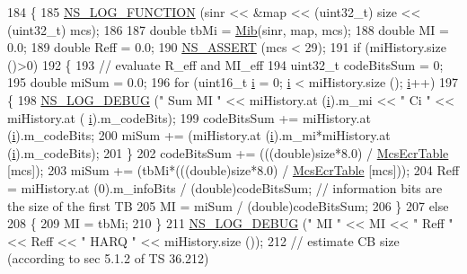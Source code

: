 \begin{DoxyCode}
184 \{
185   \hyperlink{log-macros-disabled_8h_a90b90d5bad1f39cb1b64923ea94c0761}{NS\_LOG\_FUNCTION} (sinr << &map << (uint32\_t) size << (uint32\_t) mcs);
186 
187   \textcolor{keywordtype}{double} tbMi = \hyperlink{classns3_1_1MmWaveMiErrorModel_aace9efaf2ef6d1dfbbfa3fb49c29a977}{Mib}(sinr, map, mcs);
188   \textcolor{keywordtype}{double} MI = 0.0;
189   \textcolor{keywordtype}{double} Reff = 0.0;
190   \hyperlink{assert_8h_a6dccdb0de9b252f60088ce281c49d052}{NS\_ASSERT} (mcs < 29);
191   \textcolor{keywordflow}{if} (miHistory.size ()>0)
192     \{
193       \textcolor{comment}{// evaluate R\_eff and MI\_eff}
194       uint32\_t codeBitsSum = 0;
195       \textcolor{keywordtype}{double} miSum = 0.0;
196       \textcolor{keywordflow}{for} (uint16\_t \hyperlink{bernuolliDistribution_8m_a6f6ccfcf58b31cb6412107d9d5281426}{i} = 0; \hyperlink{bernuolliDistribution_8m_a6f6ccfcf58b31cb6412107d9d5281426}{i} < miHistory.size (); \hyperlink{bernuolliDistribution_8m_a6f6ccfcf58b31cb6412107d9d5281426}{i}++)
197         \{
198           \hyperlink{group__logging_ga413f1886406d49f59a6a0a89b77b4d0a}{NS\_LOG\_DEBUG} (\textcolor{stringliteral}{" Sum MI "} << miHistory.at (\hyperlink{bernuolliDistribution_8m_a6f6ccfcf58b31cb6412107d9d5281426}{i}).m\_mi << \textcolor{stringliteral}{" Ci "} << miHistory.at (
      \hyperlink{bernuolliDistribution_8m_a6f6ccfcf58b31cb6412107d9d5281426}{i}).m\_codeBits);
199           codeBitsSum += miHistory.at (\hyperlink{bernuolliDistribution_8m_a6f6ccfcf58b31cb6412107d9d5281426}{i}).m\_codeBits;
200           miSum += (miHistory.at (\hyperlink{bernuolliDistribution_8m_a6f6ccfcf58b31cb6412107d9d5281426}{i}).m\_mi*miHistory.at (\hyperlink{bernuolliDistribution_8m_a6f6ccfcf58b31cb6412107d9d5281426}{i}).m\_codeBits);
201         \}
202       codeBitsSum += (((double)size*8.0) / \hyperlink{namespacens3_a5e80c75db664b51189d262e55aba06be}{McsEcrTable} [mcs]);
203       miSum += (tbMi*(((double)size*8.0) / \hyperlink{namespacens3_a5e80c75db664b51189d262e55aba06be}{McsEcrTable} [mcs]));
204       Reff = miHistory.at (0).m\_infoBits / (double)codeBitsSum; \textcolor{comment}{// information bits are the size of the
       first TB}
205       MI = miSum / (double)codeBitsSum;
206     \}
207   \textcolor{keywordflow}{else}
208     \{
209       MI = tbMi;
210     \}
211   \hyperlink{group__logging_ga413f1886406d49f59a6a0a89b77b4d0a}{NS\_LOG\_DEBUG} (\textcolor{stringliteral}{" MI "} << MI << \textcolor{stringliteral}{" Reff "} << Reff << \textcolor{stringliteral}{" HARQ "} << miHistory.size ());
212   \textcolor{comment}{// estimate CB size (according to sec 5.1.2 of TS 36.212)}

\end{DoxyCode}
